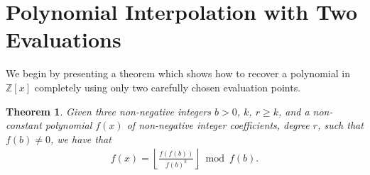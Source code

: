 \documentclass[10pt,a4paper]{article}
\theoremstyle{plain}
\newtheorem{theorem}{Theorem}[section]
\newcommand{\floor}[1]{\left\lfloor #1 \right\rfloor}
\begin{document}
\section{Polynomial Interpolation with Two Evaluations} \label{section:interpolation}
We begin by presenting a theorem which shows how to recover a polynomial in $\mathbb{Z}[x]$ completely using only two carefully chosen evaluation points.

\begin{theorem} \label{theorem:encoding}
Given three non-negative integers $b > 0$, $k$, $r \geq k$, and a non-constant polynomial $f(x)$ of non-negative integer coefficients, degree $r$, such that $f(b) \not= 0$, we have that
\begin{align*}
[x^k]f(x) = \floor{\frac{f(f(b))}{f(b)^{k}}} \bmod{f(b)} .
\end{align*}
\end{theorem}
\end{document}
